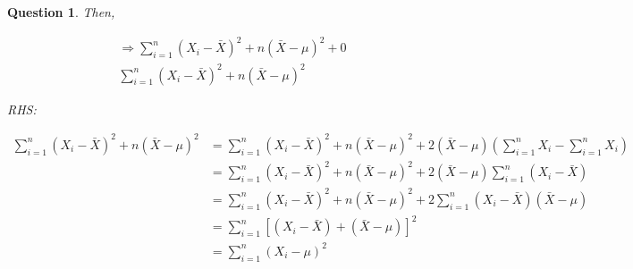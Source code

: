 \documentclass{article}
\theoremstyle{questionstyle}
\newtheorem{myquestion}{Question}
\begin{document}
\begin{myquestion}
Then, 

\begin{align*}
    \Rightarrow \sum_{i=1}^{n}(X_i - \bar{X})^2 + n(\bar{X} - \mu)^2 + 0\\
    \sum_{i=1}^{n}(X_i - \bar{X})^2 + n(\bar{X} - \mu)^2
\end{align*}


RHS: 

\begin{align*}
    \sum_{i=1}^{n}(X_i - \bar{X})^2 + n(\bar{X} - \mu)^2 &= \sum_{i=1}^{n}(X_i - \bar{X})^2 + n(\bar{X} - \mu)^2 + 2(\bar{X} - \mu)\left( \sum_{i=1}^{n}X_i - \sum_{i=1}^{n}X_i  \right)\\
    &= \sum_{i=1}^{n}(X_i - \bar{X})^2  + n(\bar{X} - \mu)^2 + 2(\bar{X} - \mu)\sum_{i=1}^{n}(X_i - \bar{X})\\
    &= \sum_{i=1}^{n}(X_i - \bar{X})^2  + n(\bar{X} - \mu)^2 + 2\sum_{i=1}^{n}(X_i - \bar{X})(\bar{X} - \mu)\\
    &= \sum_{i=1}^{n}\left[ (X_i - \bar{X}) + (\bar{X} - \mu) \right]^2 \\
    &= \sum_{i=1}^{n}( X_i - \mu )^2 \\
\end{align*}

\end{myquestion}

\end{document}
